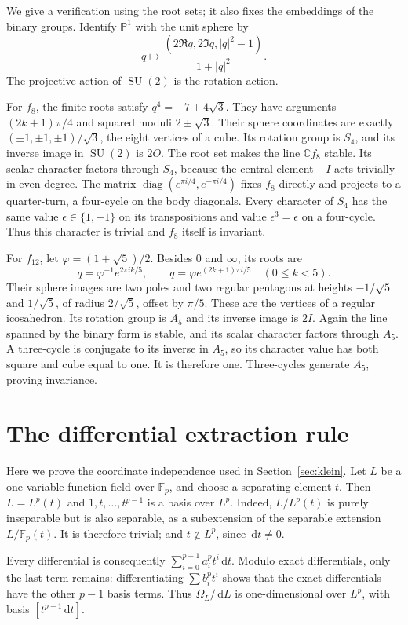 \documentclass[11pt]{article}
\numberwithin{equation}{section}
\theoremstyle{definition}
\theoremstyle{remark}
\newcommand{\C}{\mathbb C}
\newcommand{\Fp}{\mathbb F_p}
\newcommand{\dd}{\,\mathrm d}
\newcommand{\SU}{\operatorname{SU}}
\begin{document}
We give a verification using the root sets; it also fixes the embeddings
of the binary groups. Identify $\mathbb P^1$ with the unit sphere by
\[
 q\longmapsto\frac{(2\Re q,2\Im q,|q|^2-1)}{1+|q|^2}.
\]
The projective action of $\SU(2)$ is the rotation action.

For $f_8$, the finite roots satisfy $q^4=-7\pm4\sqrt3$.
They have arguments $(2k+1)\pi/4$ and squared moduli $2\pm\sqrt3$.
Their sphere coordinates are exactly
$(\pm1,\pm1,\pm1)/\sqrt3$, the eight vertices of a cube.
Its rotation group is $S_4$, and its inverse image in $\SU(2)$ is $2O$.
The root set makes the line $\C f_8$ stable. Its scalar character factors
through $S_4$, because the central element $-I$ acts trivially in even
degree. The matrix
$\operatorname{diag}(e^{\pi i/4},e^{-\pi i/4})$ fixes $f_8$ directly
and projects to a quarter-turn, a four-cycle on the body diagonals.
Every character of $S_4$ has the same value $\epsilon\in\{1,-1\}$
on its transpositions and value $\epsilon^3=\epsilon$ on a four-cycle.
Thus this character is trivial and $f_8$ itself is invariant.

For $f_{12}$, let $\varphi=(1+\sqrt5)/2$. Besides $0$ and $\infty$,
its roots are
\[
 q=\varphi^{-1}e^{2\pi i k/5},\qquad
 q=\varphi e^{(2k+1)\pi i/5}\quad(0\leq k<5).
\]
Their sphere images are two poles and two regular pentagons at heights
$-1/\sqrt5$ and $1/\sqrt5$, of radius $2/\sqrt5$, offset by $\pi/5$.
These are the vertices of a regular icosahedron. Its rotation group is
$A_5$ and its inverse image is $2I$. Again the line spanned by the
binary form is stable, and its scalar character factors through $A_5$.
A three-cycle is conjugate to its inverse in $A_5$, so its character
value has both square and cube equal to one. It is therefore one.
Three-cycles generate $A_5$, proving invariance.

\section{The differential extraction rule}\label{app:cartier}

Here we prove the coordinate independence used in
Section~\ref{sec:klein}. Let $L$ be a one-variable function field over
$\Fp$, and choose a separating element $t$. Then
$L=L^p(t)$ and $1,t,\ldots,t^{p-1}$ is a basis over $L^p$.
Indeed, $L/L^p(t)$ is purely inseparable but is also separable, as a
subextension of the separable extension $L/\Fp(t)$. It is therefore
trivial; and $t\notin L^p$, since $\dd t\ne0$.

Every differential is consequently $\sum_{i=0}^{p-1}a_i^pt^i\dd t$.
Modulo exact differentials, only the last term remains: differentiating
$\sum b_i^pt^i$ shows that the exact differentials have the other
$p-1$ basis terms. Thus $\Omega_L/\dd L$ is one-dimensional over $L^p$,
with basis $[t^{p-1}\dd t]$.
\end{document}
